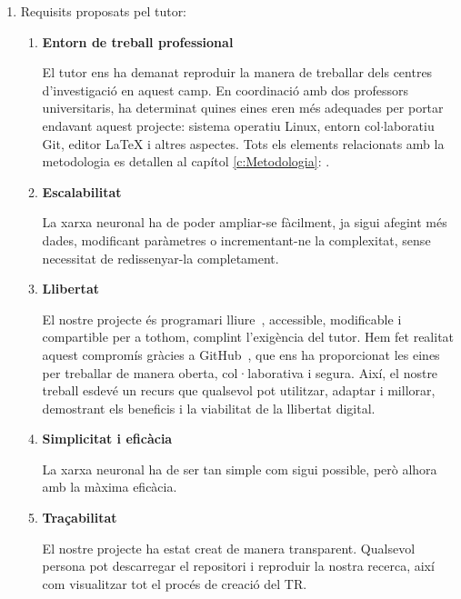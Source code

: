 \begin{enumerate}

    \item Requisits proposats pel tutor:

    \begin{enumerate}

        \item \textbf{Entorn de treball professional}

        El tutor ens ha demanat reproduir la manera de treballar dels centres d'investigació en aquest camp. En coordinació amb dos professors universitaris, ha determinat quines eines eren més adequades per portar endavant aquest projecte: sistema operatiu Linux, entorn col$\cdot$laboratiu Git, editor LaTeX i altres aspectes. Tots els elements relacionats amb la metodologia es detallen al capítol \ref{c:Metodologia}: .

        \item \textbf{Escalabilitat}

        La xarxa neuronal ha de poder ampliar-se fàcilment, ja sigui afegint més dades, modificant paràmetres o incrementant-ne la complexitat, sense necessitat de redissenyar-la completament.

        \item \textbf{Llibertat}

        El nostre projecte és programari lliure~\cite{ProgramariLliure}, accessible, modificable i compartible per a tothom, complint l’exigència del tutor. Hem fet realitat aquest compromís gràcies a GitHub~\cite{GitHub}, que ens ha proporcionat les eines per treballar de manera oberta, col·laborativa i segura. Així, el nostre treball esdevé un recurs que qualsevol pot utilitzar, adaptar i millorar, demostrant els beneficis i la viabilitat de la llibertat digital.

        \item \textbf{Simplicitat i eficàcia}

        La xarxa neuronal ha de ser tan simple com sigui possible, però alhora amb la màxima eficàcia.

        \item \textbf{Traçabilitat}

        El nostre projecte ha estat creat de manera transparent. Qualsevol persona pot descarregar el repositori i reproduir la nostra recerca, així com visualitzar tot el procés de creació del TR.

    \end{enumerate}


\end{enumerate}
